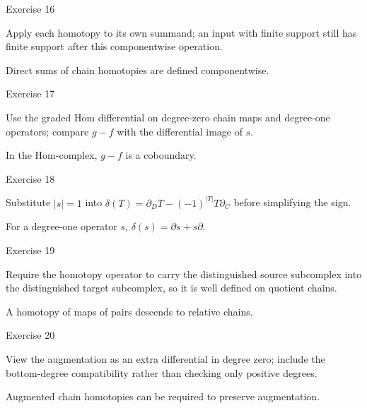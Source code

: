 \begin{exercise}\label{exr:viii22-16}
Exercise 16
\end{exercise}
\begin{hint}
Apply each homotopy to its own summand; an input with finite support still has finite support after this componentwise operation.
\end{hint}
\begin{solution}
Direct sums of chain homotopies are defined componentwise.
\end{solution}

\begin{exercise}\label{exr:viii22-17}
Exercise 17
\end{exercise}
\begin{hint}
Use the graded Hom differential on degree-zero chain maps and degree-one operators; compare \(g-f\) with the differential image of \(s\).
\end{hint}
\begin{solution}
In the Hom-complex, \(g-f\) is a coboundary.
\end{solution}

\begin{exercise}\label{exr:viii22-18}
Exercise 18
\end{exercise}
\begin{hint}
Substitute \(|s|=1\) into \(\delta(T)=\partial_D T-(-1)^{|T|}T\partial_C\) before simplifying the sign.
\end{hint}
\begin{solution}
For a degree-one operator \(s\), \(\delta(s)=\partial s+s\partial\).
\end{solution}

\begin{exercise}\label{exr:viii22-19}
Exercise 19
\end{exercise}
\begin{hint}
Require the homotopy operator to carry the distinguished source subcomplex into the distinguished target subcomplex, so it is well defined on quotient chains.
\end{hint}
\begin{solution}
A homotopy of maps of pairs descends to relative chains.
\end{solution}

\begin{exercise}\label{exr:viii22-20}
Exercise 20
\end{exercise}
\begin{hint}
View the augmentation as an extra differential in degree zero; include the bottom-degree compatibility rather than checking only positive degrees.
\end{hint}
\begin{solution}
Augmented chain homotopies can be required to preserve augmentation.
\end{solution}

